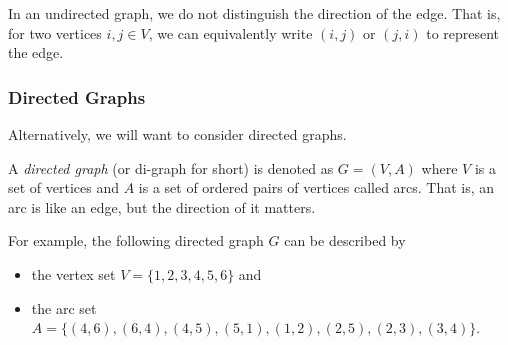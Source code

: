 \begin{center}
\par{}\label{fig:modeling-sums-continued-tikz01}%

\end{center}

In an undirected graph, we do not distinguish the direction of the edge.  That is, for two vertices $i,j \in V$, we can equivalently write $(i,j)$ or $(j,i)$ to represent the edge.

\subsubsection{Directed Graphs}
Alternatively, we will want to consider directed graphs.  
\begin{definition}{}{}
A \emph{directed graph} (or di-graph for short) is denoted as $G = (V, A)$ where $V$ is a set of vertices and $A$ is a set of ordered pairs of vertices called arcs.  That is, an arc is like an edge, but the direction of it matters.
\end{definition}
For example, the following directed graph $G$ can be described by
\begin{itemize}
\item  the vertex set $V = \{1,2,3,4,5,6\}$ and 
\item the arc set $ A= \{(4,6),(6,4), (4,5), (5,1), (1,2), (2,5), (2,3), (3,4)\}$.
\end{itemize}
\begin{center}
\par{}\label{fig:modeling-sums-continued-tikz02}%

\end{center}

